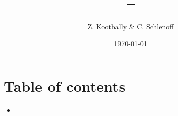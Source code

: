 \documentclass[usenames,11,dvipsnames,svgnames,x11names,aspectratio=1610,bibref]{beamer}
\title[ENPM663~|~ROS -- Part 1]{\cnordZero{ENPM663} -- \cnordTwo{L2: ROS -- Part 1}}
\author{Z. Kootbally \& C. Schlenoff}
\institute{University of Maryland}
\date{\today}
\renewcommand\sec{{\cnordSix{\secname}\hfill\mydisclaimer} }
\begin{document}
\titlepage%
% 




\section*{Table of contents}
\begin{frame}[fragile]{\sec}
\vspace{10pt}
\begin{multicols}{2}
{\tiny
\begin{itemize}
\item[]\tableofcontents[]
\end{itemize}
}
\end{multicols}
\end{frame}

\end{document}
